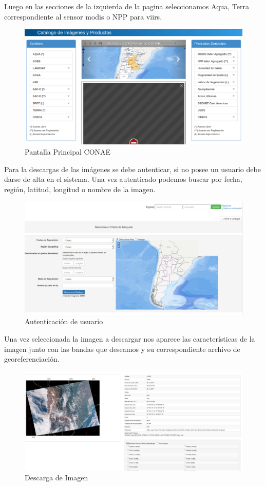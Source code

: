 Luego en las secciones de la izquierda de la pagina seleccionamos Aqua, Terra correspondiente al sensor modis o NPP para viirs.
\begin{figure}[h]
 \centering
  \includegraphics[scale=0.3,keepaspectratio=true,clip=true]{imagenes/Apendice/conaepag1.png}
  \caption{Pantalla Principal CONAE}
\end{figure}
Para la descargas de las imágenes se debe autenticar, si no posee un usuario debe darse de alta en el sistema. Una vez autenticado podemos buscar por fecha, región, latitud,
longitud o nombre de la imagen.
\begin{figure}[h]
 \centering
  \includegraphics[scale=0.2,keepaspectratio=true,clip=true]{imagenes/Apendice/conaepag2.png}
  \caption{Autenticación de usuario}
\end{figure}
Una vez seleccionada la imagen a descargar nos aparece las características de la imagen junto con las bandas que deseamos y su correspondiente archivo de georeferenciación.
\begin{figure}[H]
 \centering
  \includegraphics[scale=0.2,keepaspectratio=true,clip=true]{imagenes/Apendice/conaepag3.png}
  \caption{Descarga de Imagen}
\end{figure}

